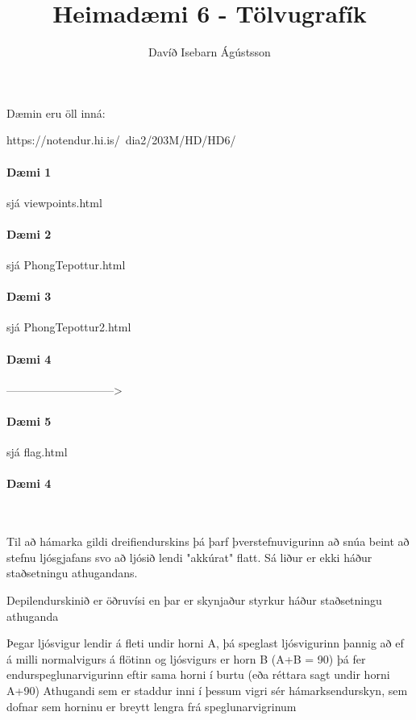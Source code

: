 \documentclass[11pt,twocolumn]{article}
\title{ Heimadæmi 6 - Tölvugrafík }
\date{}
\author{Davíð Isebarn Ágústsson }
\begin{document}
\maketitle

Dæmin eru öll inná:

https://notendur.hi.is/~dia2/203M/HD/HD6/

\paragraph{Dæmi 1}
sjá viewpoints.html

\paragraph{Dæmi 2}
sjá PhongTepottur.html

\paragraph{Dæmi 3}
sjá PhongTepottur2.html

\paragraph{Dæmi 4}
----------------------------->

\paragraph{Dæmi 5}
sjá flag.html


\newpage

\paragraph{Dæmi 4}

\

Til að hámarka gildi dreifiendurskins þá þarf þverstefnuvigurinn að snúa beint að stefnu ljósgjafans svo að ljósið lendi "akkúrat" flatt. Sá liður er ekki háður staðsetningu athugandans.

Depilendurskinið er öðruvísi en þar er skynjaður styrkur háður staðsetningu athuganda

Þegar ljósvigur lendir á fleti undir horni A, þá speglast ljósvigurinn þannig að ef á milli
normalvigurs á flötinn og ljósvigurs er horn B (A+B = 90) þá fer endurspeglunarvigurinn
eftir sama horni í burtu (eða réttara sagt undir horni A+90) 
Athugandi sem er staddur inni í þessum vigri sér hámarksendurskyn, sem dofnar sem horninu er breytt lengra frá speglunarvigrinum
\end{document}
